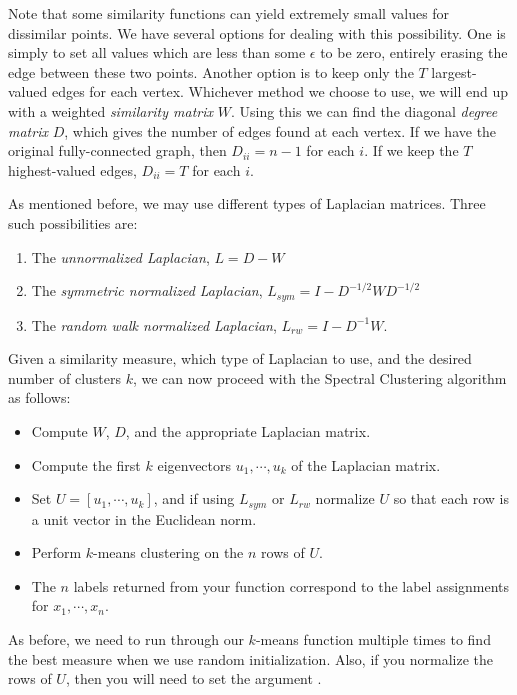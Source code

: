Note that some similarity functions can yield extremely small values for dissimilar points.  We have several options for dealing with this possibility.  One is simply to set all values which are less than some $\epsilon$ to be zero, entirely erasing the edge between these two points.  Another option is to keep only the $T$ largest-valued edges for each vertex.  Whichever method we choose to use, we will end up with a weighted \emph{similarity matrix} $W$.  Using this we can find the diagonal \emph{degree matrix} $D$, which gives the number of edges found at each vertex.  If we have the original fully-connected graph, then $D_{ii} = n-1$ for each $i$.  If we keep the $T$ highest-valued edges, $D_{ii} = T$ for each $i$.

As mentioned before, we may use different types of Laplacian matrices.  Three such possibilities are:
\begin{enumerate}
    \item The \emph{unnormalized Laplacian}, $L = D - W$
    \item The \emph{symmetric normalized Laplacian}, $L_{sym} = I - D^{-1/2}WD^{-1/2}$
    \item The \emph{random walk normalized Laplacian}, $L_{rw} = I - D^{-1}W$.
 \end{enumerate}

Given a similarity measure, which type of Laplacian to use, and the desired number of clusters $k$, we can now proceed with the Spectral Clustering algorithm as follows:

\begin{itemize}
    \item Compute $W$, $D$, and the appropriate Laplacian matrix.
    \item Compute the first $k$ eigenvectors $u_1, \cdots , u_k$ of the Laplacian matrix.
    \item Set $U = [u_1, \cdots , u_k]$, and if using $L_{sym}$ or $L_{rw}$ normalize $U$ so that each row is a unit vector in the Euclidean norm.
    \item Perform $k$-means clustering on the $n$ rows of $U$.
    \item The $n$ labels returned from your  function correspond to the label assignments for $x_1, \cdots, x_n$.
\end{itemize}

As before, we need to run through our $k$-means function multiple times to find the best measure when we use random initialization.  Also, if you normalize the rows of $U$, then you will need to set the argument .

